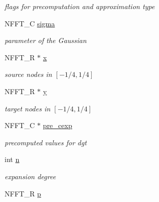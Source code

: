 \begin{DoxyCompactItemize}
\begin{DoxyCompactList}\small\item\em flags for precomputation and approximation type \end{DoxyCompactList}\item 
\hypertarget{structfgt__plan_ab690a4e4853c7f2dbda1eee17f5ed08c}{N\-F\-F\-T\-\_\-\-C \hyperlink{structfgt__plan_ab690a4e4853c7f2dbda1eee17f5ed08c}{sigma}}\label{structfgt__plan_ab690a4e4853c7f2dbda1eee17f5ed08c}

\begin{DoxyCompactList}\small\item\em parameter of the Gaussian \end{DoxyCompactList}\item 
\hypertarget{structfgt__plan_a3725b838897903650d71210a5da7d7f3}{N\-F\-F\-T\-\_\-\-R $\ast$ \hyperlink{structfgt__plan_a3725b838897903650d71210a5da7d7f3}{x}}\label{structfgt__plan_a3725b838897903650d71210a5da7d7f3}

\begin{DoxyCompactList}\small\item\em source nodes in $[-1/4,1/4]$ \end{DoxyCompactList}\item 
\hypertarget{structfgt__plan_a791beea18e40cbfc62d568b3763dc058}{N\-F\-F\-T\-\_\-\-R $\ast$ \hyperlink{structfgt__plan_a791beea18e40cbfc62d568b3763dc058}{y}}\label{structfgt__plan_a791beea18e40cbfc62d568b3763dc058}

\begin{DoxyCompactList}\small\item\em target nodes in $[-1/4,1/4]$ \end{DoxyCompactList}\item 
\hypertarget{structfgt__plan_ad92c59da13b418970179894773209b6e}{N\-F\-F\-T\-\_\-\-C $\ast$ \hyperlink{structfgt__plan_ad92c59da13b418970179894773209b6e}{pre\-\_\-cexp}}\label{structfgt__plan_ad92c59da13b418970179894773209b6e}

\begin{DoxyCompactList}\small\item\em precomputed values for dgt \end{DoxyCompactList}\item 
\hypertarget{structfgt__plan_a2e6ad196b67db3b9811fdb8e777633b1}{int \hyperlink{structfgt__plan_a2e6ad196b67db3b9811fdb8e777633b1}{n}}\label{structfgt__plan_a2e6ad196b67db3b9811fdb8e777633b1}

\begin{DoxyCompactList}\small\item\em expansion degree \end{DoxyCompactList}\item 
\hypertarget{structfgt__plan_a7e440f480f63238640ab81a16f4c11ec}{N\-F\-F\-T\-\_\-\-R \hyperlink{structfgt__plan_a7e440f480f63238640ab81a16f4c11ec}{p}}\label{structfgt__plan_a7e440f480f63238640ab81a16f4c11ec}


\end{DoxyCompactItemize}
